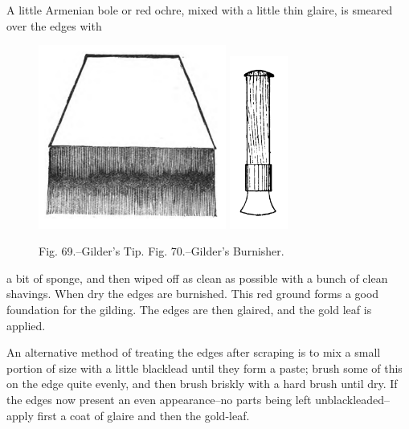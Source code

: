 \documentclass[twoside]{book}
\begin{document}
A little Armenian bole or red ochre, mixed with
a little thin glaire, is smeared over the edges with
\begin{figure}[h]
	\centering
	\includegraphics[width=0.55\textwidth]{Figures/_069.png}
	\includegraphics[width=0.17\textwidth]{Figures/_070.png}
	\caption*{
		Fig. 69.--Gilder's Tip.
		Fig. 70.--Gilder's Burnisher.
     }
\end{figure}
a bit of sponge, and then wiped off as clean as
possible with a bunch of clean shavings. When
dry the edges are burnished. This red ground
forms a good foundation for the gilding. The
edges are then glaired, and the gold leaf is applied.

An alternative method of treating the edges after
scraping is to mix a small portion of size with a
little blacklead until they form a paste; brush some
of this on the edge quite evenly, and then brush
briskly with a hard brush until dry. If the edges
now present an even appearance--no parts being
\pagebreak
left unblackleaded--apply first a coat of glaire and
then the gold-leaf.
\end{document}
